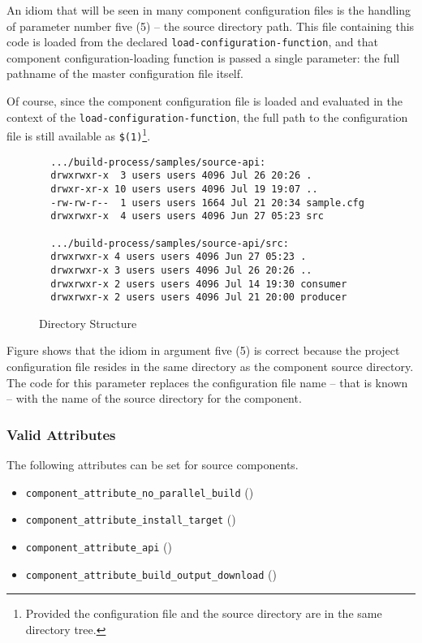 An idiom that will be seen in many component configuration files is
the handling of parameter number five (5) -- the source directory
path.  This file containing this code is loaded from the declared
\texttt{load-configuration-function}, and that component
configuration-loading function is passed a single parameter: the full
pathname of the master configuration file itself.

Of course, since the component configuration file is loaded and
evaluated in the context of the \texttt{load-configuration-function},
the full path to the configuration file is still available as
\texttt{\$(1)}\footnote{Provided the configuration file and the source
  directory are in the same directory tree.}.

\begin{figure}
\hrulefill
\begin{small}
\begin{verbatim}
  .../build-process/samples/source-api:
  drwxrwxr-x  3 users users 4096 Jul 26 20:26 .
  drwxr-xr-x 10 users users 4096 Jul 19 19:07 ..
  -rw-rw-r--  1 users users 1664 Jul 21 20:34 sample.cfg
  drwxrwxr-x  4 users users 4096 Jun 27 05:23 src

  .../build-process/samples/source-api/src:
  drwxrwxr-x 4 users users 4096 Jun 27 05:23 .
  drwxrwxr-x 3 users users 4096 Jul 26 20:26 ..
  drwxrwxr-x 2 users users 4096 Jul 14 19:30 consumer
  drwxrwxr-x 2 users users 4096 Jul 21 20:00 producer
\end{verbatim}
\end{small}
\hrulefill
\caption{Directory Structure}\label{wrap:config-structure}
\end{figure}

Figure  shows that the idiom in argument
five (5) is correct because the project configuration file resides in
the same directory as the component source directory.  The code for
this parameter replaces the configuration file name -- that is known
-- with the name of the source directory for the component.

\subsubsection{Valid Attributes}

The following attributes can be set for source components.

\begin{itemize}
\item{\texttt{component\_attribute\_no\_parallel\_build}}
  ()
\item{\texttt{component\_attribute\_install\_target}} ()
\item{\texttt{component\_attribute\_api}} ()
\item{\texttt{component\_attribute\_build\_output\_download}} ()
\end{itemize}

